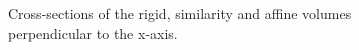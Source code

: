   	\begin{figure}[htbp]
  	  \centering
  	  \caption{Cross-sections of the rigid, similarity and affine volumes perpendicular to the x-axis.}
  	  \label{fig:hires_0_235}
  	\end{figure}

